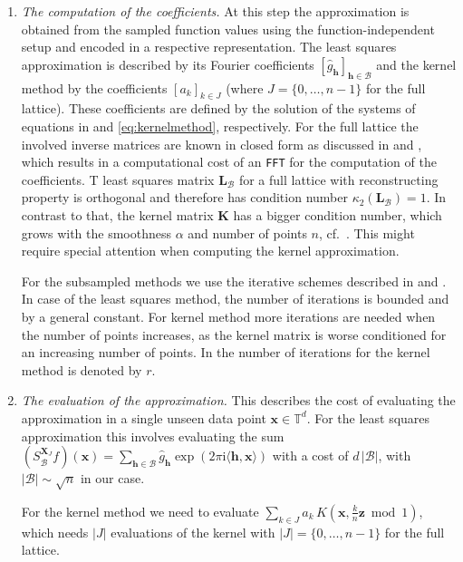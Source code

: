 \documentclass[a4paper]{amsart}
\renewcommand{\hat}{\widehat}
\newcommand{\modone}{\bmod{}1}
\begin{document}
\begin{enumerate}
\item
    \emph{The computation of the coefficients.}
    At this step the approximation is obtained from the sampled function values using the function-independent setup and encoded in a respective representation.
    The least squares approximation is described by its Fourier coefficients $[ \hat g_{\bm h} ]_{\bm h\in\mathcal B}$ and the kernel method by the coefficients $[a_k]_{k\in J}$ (where $J=\{0,\dots,n-1\}$ for the full lattice).
    These coefficients are defined by the solution of the systems of equations in  and \eqref{eq:kernelmethod}, respectively.
    For the full lattice the involved inverse matrices are known in closed form as discussed in  and , which results in a computational cost of an \texttt{FFT} for the computation of the coefficients.
    T least squares matrix $\bm L_{\mathcal B}$ for a full lattice with reconstructing property  is orthogonal and therefore has condition number $\kappa_2(\bm L_{\mathcal B}) = 1$.
    In contrast to that, the kernel matrix $\bm K$ has a bigger condition number, which grows with the smoothness $\alpha$ and number of points $n$, cf.~\cite[Chapter~6]{abithesis}.
    This might require special attention when computing the kernel approximation.{}

    For the subsampled methods we use the iterative schemes described in  and .
    In case of the least squares method, the number of iterations is bounded and by a general constant.
    For kernel method more iterations are needed when the number of points increases, as the kernel matrix is worse conditioned for an increasing number of points.
    In  the number of iterations for the kernel method is denoted by $r$.
    
\item
    \emph{The evaluation of the approximation.}
    This describes the cost of evaluating the approximation in a single unseen data point $\bm x\in\mathds T^d$.
    For the least squares approximation this involves evaluating the sum
    $(S_{\mathcal B}^{\bm X_J} f)(\bm x) = \sum_{\bm h\in\mathcal B}\hat g_{\bm h} \exp(2\pi\mathrm i\langle\bm h,\bm x\rangle)$
    with a cost of $d\,|\mathcal B|$, with $|\mathcal B|\sim\sqrt n$ in our case.

    For the kernel method we need to evaluate $\sum_{k\in J} a_k \, K(\bm x,\tfrac kn\bm z\modone)$, which needs $|J|$ evaluations of the kernel with $|J| = \{0,\dots,n-1\}$ for the full lattice.
\end{enumerate}
\end{document}
